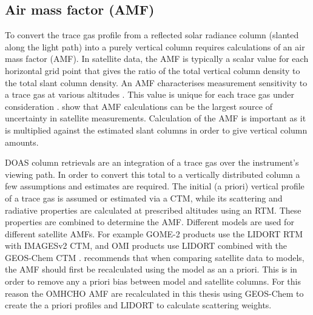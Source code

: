  \subsection{Air mass factor (AMF)}
  \label{Model:omhcho:amf}
    To convert the trace gas profile from a reflected solar radiance column (slanted along the light path) into a purely vertical column requires calculations of an air mass factor (AMF).
    In satellite data, the AMF is typically a scalar value for each horizontal grid point that gives the ratio of the total vertical column density to the total slant column density.
    An AMF characterises measurement sensitivity to a trace gas at various altitudes \parencite{Palmer2001}.
    This value %
    is unique for each trace gas under consideration \parencite{Palmer2001,Millet2006}.
    \textcite{Lorente2017} show that AMF calculations can be the largest source of uncertainty in satellite measurements.
    Calculation of the AMF is important as it is multiplied against the estimated slant columns in order to give vertical column amounts.
    
    DOAS column retrievals are an integration of a trace gas over the instrument's viewing path.
    In order to convert this total to a vertically distributed column a few assumptions and estimates are required. 
    The initial (a priori) vertical profile of a trace gas is assumed or estimated via a CTM, while its scattering and radiative properties are calculated at prescribed altitudes using an RTM. 
    These properties are combined to determine the AMF.
    Different models are used for different satellite AMFs.
    For example GOME-2 products %
    use the LIDORT RTM with IMAGESv2 CTM, and OMI products use LIDORT combined with the GEOS-Chem CTM \parencite{Chance2002, Abad2015}.
    \textcite{Lamsal2014} recommends that when comparing satellite data to models, the AMF should first be recalculated using the model as an a priori.
    This is in order to remove any a priori bias between model and satellite columns.
    For this reason the OMHCHO AMF are recalculated in this thesis using GEOS-Chem to create the a priori profiles and LIDORT to calculate scattering weights.
    

